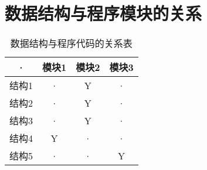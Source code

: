     \section{数据结构与程序模块的关系}
        \begin{table}[htbp]
            \centering
            \caption{数据结构与程序代码的关系表} \label{tab:datastructure-module}
            \begin{tabular}{|c|c|c|c|}
                \hline
                · & 模块1 & 模块2 & 模块3 \\
                \hline
                结构1 & · & Y & · \\
                \hline
                结构2 & · & Y & · \\
                \hline
                结构3 & · & Y & · \\
                \hline
                结构4 & Y & · & · \\
                \hline
                结构5 & · & · & Y \\
                \hline
            \end{tabular}
        \end{table}
